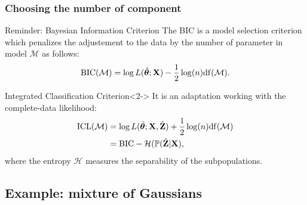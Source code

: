 \documentclass{beamer}\usepackage[]{graphicx}\usepackage[]{color}
\begin{document}
\begin{frame}
  \frametitle{Choosing the number of component}

  \begin{block}{Reminder: Bayesian Information Criterion}
    The BIC is a model selection criterion which penalizes the adjustement to the data by the number of parameter in model $\mathcal{M}$ as follows:
    \begin{equation*}
      \mathrm{BIC}(\mathcal{M}) = \log L(\,\hat{\!\boldsymbol\theta}; \mathbf{X}) - \frac{1}{2}\log(n) \mathrm{df}(\mathcal{M}).
    \end{equation*}
  \end{block}

  \vspace{-.35cm}

  \begin{block}{Integrated Classification Criterion}<2->
    It is an adaptation working with the complete-data likelihood:
    \vspace{-.25cm}
    \begin{align*}
      \mathrm{ICL}(\mathcal{M}) & = \log L(\,\hat{\!\boldsymbol\theta}; \mathbf{X}, \hat{\mathbf{Z}}) + \frac{1}{2}\log(n) \mathrm{df}(\mathcal{M}) \\
      & = \mathrm{BIC} - \mathcal{H}(\mathbb{P}(\hat {\mathbf{Z}} | \mathbf{X}),
    \end{align*}
    where the entropy $\mathcal{H}$ measures the separability of the subpopulations.
  \end{block}

  \vfill

\end{frame}

\subsection{Example: mixture of Gaussians}
\end{document}
